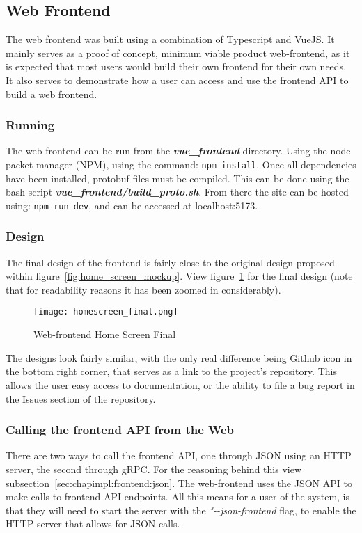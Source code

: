 \subsection{Web Frontend} \label{sec:chapimpl:frontend:web}
The web frontend was built using a combination of Typescript and VueJS. It mainly serves as a proof of concept, minimum viable product web-frontend, as it is expected that most users would build their own frontend for their own needs. It also serves to demonstrate how a user can access and use the frontend API to build a web frontend.

\subsubsection{Running}
The web frontend can be run from the \textit{\textbf{vue\_frontend}} directory. Using the node packet manager (NPM), using the command: \verb|npm install|. Once all dependencies have been installed, protobuf files must be compiled. This can be done using the bash script \textit{\textbf{vue\_frontend/build\_proto.sh}}. From there the site can be hosted using: \verb|npm run dev|, and can be accessed at \mbox{localhost:5173}.

\subsubsection{Design}
The final design of the frontend is fairly close to the original design proposed within figure~\ref{fig:home_screen_mockup}. View figure~\ref{fig:home_screen_final} for the final design (note that for readability reasons it has been zoomed in considerably).

\begin{figure}[h]
\caption{Web-frontend Home Screen Final}
\texttt{[image: homescreen\_final.png]}
\label{fig:home_screen_final}
\end{figure}

The designs look fairly similar, with the only real difference being Github icon in the bottom right corner, that serves as a link to the project's repository. This allows the user easy access to documentation, or the ability to file a bug report in the Issues section of the repository.

\subsubsection{Calling the frontend API from the Web}
There are two ways to call the frontend API, one through JSON using an HTTP server, the second through gRPC. For the reasoning behind this view subsection~\ref{sec:chapimpl:frontend:json}. The web-frontend uses the JSON API to make calls to frontend API endpoints. All this means for a user of the system, is that they will need to start the server with the \textit{"-{}-json-frontend} flag, to enable the HTTP server that allows for JSON calls.

